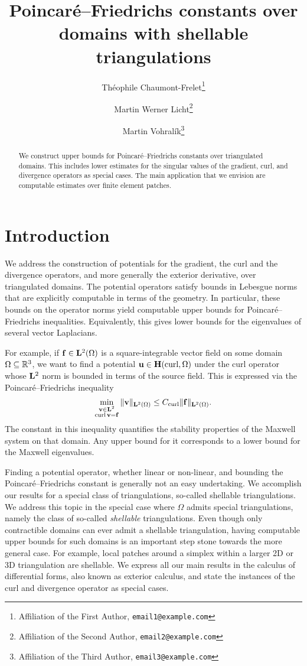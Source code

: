 \documentclass[a4paper]{article}
\title{Poincar\'e--Friedrichs constants over domains with shellable triangulations}
\author{
    Th\'eophile Chaumont-Frelet\thanks{Affiliation of the First Author, \texttt{email1@example.com}} \and
    Martin Werner Licht\thanks{Affiliation of the Second Author, \texttt{email2@example.com}} \and
    Martin Vohral\'ik\thanks{Affiliation of the Third Author, \texttt{email3@example.com}}
}
\begin{document}
\maketitle

\begin{abstract}
    We construct upper bounds for Poincar\'e--Friedrichs constants over triangulated domains. 
    This includes lower estimates for the singular values of the gradient, curl, and divergence operators as special cases. 
    The main application that we envision are computable estimates over finite element patches. 
\end{abstract}


\section{Introduction}\label{section:intro}

We address the construction of potentials for the gradient, the curl and the divergence operators, and more generally the exterior derivative, over triangulated domains. 
The potential operators satisfy bounds in Lebesgue norms that are explicitly computable in terms of the geometry. 
In particular, these bounds on the operator norms yield computable upper bounds for Poincar\'e--Friedrichs inequalities. 
Equivalently, this gives lower bounds for the eigenvalues of several vector Laplacians. 

For example, if ${\mathbf f} \in {\mathbf L}^{2}(\Omega)$ is a square-integrable vector field on some domain $\Omega \subseteq {\mathbb R}^3$, 
we want to find a potential ${\mathbf u} \in {\mathbf H}(\operatorname{curl},\Omega)$ under the curl operator whose ${\mathbf L}^2$ norm is bounded in terms of the source field. This is expressed via the Poincar\'e--Friedrichs inequality 
\begin{align*}
    \min\limits_{ \substack{ {\mathbf v} \in {\mathbf L}^{2} \\ \operatorname{curl} {\mathbf v} = {\mathbf f} } } \| {\mathbf v} \|_{{\mathbf L}^{2}(\Omega)}
    \leq 
    C_{\operatorname{curl}}
    \| {\mathbf f} \|_{{\mathbf L}^{2}(\Omega)}
    .
\end{align*}
The constant in this inequality quantifies the stability properties of the Maxwell system on that domain. Any upper bound for it corresponds to a lower bound for the Maxwell eigenvalues.

Finding a potential operator, whether linear or non-linear, and bounding the Poincar\'e--Friedrichs constant is generally not an easy undertaking. 
We accomplish our results for a special class of triangulations, so-called shellable triangulations.
We address this topic in the special case where $\Omega$ admits special triangulations, 
namely the class of so-called \emph{shellable} triangulations. 
Even though only contractible domains can ever admit a shellable triangulation, 
having computable upper bounds for such domains is an important step stone towards the more general case. 
For example, local patches around a simplex within a larger 2D or 3D triangulation are shellable.
We express all our main results in the calculus of differential forms, also known as exterior calculus, 
and state the instances of the curl and divergence operator as special cases. 
\\
\end{document}
